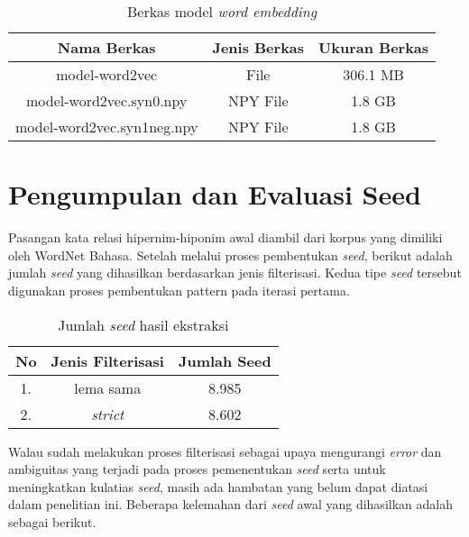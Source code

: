 \begin{table}
  \centering
    \caption{Berkas model \textit{word embedding}}
    \label{table:modelWE}
    \begin{tabular}{|c|c|c|}
      \hline
        Nama Berkas                       & Jenis Berkas & Ukuran Berkas \\ \hline
        model-word2vec                    & File         & 306.1 MB      \\ \hline
        model-word2vec.syn0.npy           & NPY File     & 1.8 GB        \\ \hline
        model-word2vec.syn1neg.npy        & NPY File     & 1.8 GB        \\ \hline
    \end{tabular}
\end{table}

\section{Pengumpulan dan Evaluasi Seed}
\label{bab-pengumpulanseed}
Pasangan kata relasi hipernim-hiponim awal diambil dari korpus yang dimiliki oleh WordNet Bahasa. Setelah melalui proses pembentukan \textit{seed}, berikut adalah jumlah \textit{seed} yang dihasilkan berdasarkan jenis filterisasi. Kedua tipe \textit{seed} tersebut digunakan proses pembentukan pattern pada iterasi pertama. 

\begin{table}
  \centering
    \caption{Jumlah \textit{seed} hasil ekstraksi}
      \label{table:jumlahSeed}
      \begin{tabular}{|c|c|c|}
        \hline
          No & Jenis Filterisasi & Jumlah Seed \\ \hline
          1. & lema sama         & 8.985       \\ \hline
          2. & \textit{strict}   & 8.602       \\ \hline
    \end{tabular}
\end{table}

Walau sudah melakukan proses filterisasi sebagai upaya mengurangi \textit{error} dan ambiguitas yang terjadi pada proses pemenentukan \textit{seed} serta untuk meningkatkan kulatias \textit{seed}, masih ada hambatan yang belum dapat diatasi dalam penelitian ini. Beberapa kelemahan dari \textit{seed} awal yang dihasilkan adalah sebagai berikut.

